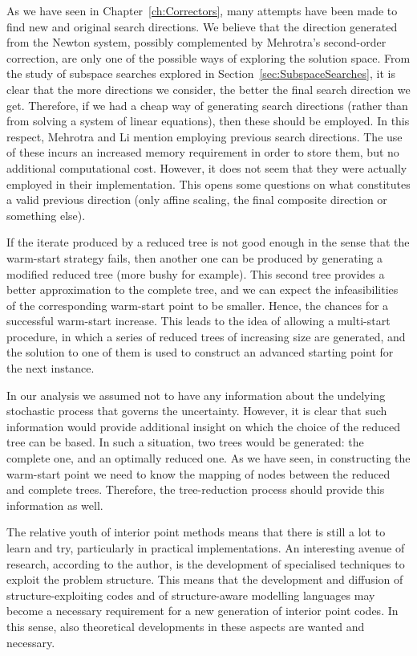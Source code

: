 As we have seen in Chapter~\ref{ch:Correctors}, many attempts
have been made to find new and original search directions.
We believe that the direction generated from the Newton system,
possibly complemented by Mehrotra's second-order correction,
are only one of the possible ways of exploring the solution space.
From the study of subspace searches explored in
Section~\ref{sec:SubspaceSearches}, it is clear that the more 
directions we consider, the better the final search direction 
we get. Therefore, if we had a cheap way of generating search
directions (rather than from solving a system of linear equations),
then these should be employed.
In this respect, Mehrotra and Li \cite{MehrotraLi} 
mention employing previous search directions.
The use of these incurs an increased memory requirement
in order to store them, but no additional computational cost.
However, it does not seem that they were actually employed in
their implementation.
This opens some questions on what constitutes a valid
previous direction (only affine scaling, the final composite direction
or something else).

If the iterate produced by a reduced tree is not good enough 
in the sense that the warm-start strategy fails, then another one 
can be produced by generating a modified reduced tree (more 
bushy for example).
This second tree provides a better approximation to the
complete tree, and we can expect the infeasibilities of the 
corresponding warm-start point to be smaller.
Hence, the chances for a successful 
warm-start increase.
This leads to the idea of allowing a multi-start procedure, in
which a series of reduced trees of increasing size are generated,
and the solution to one of them is used to construct an 
advanced starting point for the next instance.

In our analysis we assumed not to have any information about the
undelying stochastic process that governs the uncertainty.
However, it is clear that such information would provide additional
insight on which the choice of the reduced tree can be based.
In such a situation, two trees would be generated: the complete one,
and an optimally reduced one.
As we have seen, in constructing the warm-start point we need
to know the mapping of nodes between the reduced and complete trees.
Therefore, the tree-reduction process should provide this information
as well.

The relative youth of interior point methods means that there is still
a lot to learn and try, particularly in practical implementations.
An interesting avenue of research, according to the author, is the development
of specialised techniques to exploit the problem structure.
This means that the development and diffusion of structure-exploiting
codes and of structure-aware modelling languages may become a necessary
requirement for a new generation of interior point codes.
In this sense, also theoretical developments in these aspects are 
wanted and necessary.
